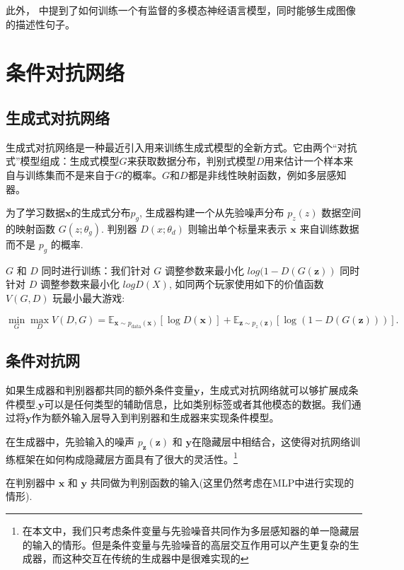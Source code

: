 \documentclass{article} %
\begin{document}
此外，\cite{kiros2013multimodal} 中提到了如何训练一个有监督的多模态神经语言模型，同时能够生成图像的描述性句子。

\section{条件对抗网络}
\subsection{生成式对抗网络}
生成式对抗网络是一种最近引入用来训练生成式模型的全新方式。它由两个“对抗式”模型组成：生成式模型$G$来获取数据分布，判别式模型$D$用来估计一个样本来自与训练集而不是来自于$G$的概率。$G$和$D$都是非线性映射函数，例如多层感知器。

为了学习数据${\bm{x}}$的生成式分布${p_g}$, 生成器构建一个从先验噪声分布 ${p_z(z)}$ 数据空间的映射函数 ${G(z;\theta_g)}$. 判别器 ${D(x; \theta_d)}$ 则输出单个标量来表示 ${\bm{x}}$ 来自训练数据而不是 ${p_g}$ 的概率.

${G}$ 和 ${D}$ 同时进行训练：我们针对 ${G}$ 调整参数来最小化 ${log(1-D(G(\bm{z}))}$ 同时针对 $D$ 调整参数来最小化 ${logD(X)}$, 如同两个玩家使用如下的价值函数 ${V(G, D)}$ 玩最小最大游戏:


\begin{equation}
\label{eq:minimaxgame-definition}
\min_G \max_D V(D, G) = \mathbb{E}_{\bm{x} \sim p_{\text{data}}(\bm{x})}[\log D(\bm{x})] + \mathbb{E}_{\bm{z} \sim p_z(\bm{z})}[\log (1 - D(G(\bm{z})))].
\end{equation}


\subsection{条件对抗网}

如果生成器和判别器都共同的额外条件变量${\bm{y}}$，生成式对抗网络就可以够扩展成条件模型.${\bm{y}}$可以是任何类型的辅助信息，比如类别标签或者其他模态的数据。我们通过将${\bm{y}}$作为额外输入层导入到判别器和生成器来实现条件模型。


在生成器中，先验输入的噪声 $p_{\bm{z}}(\bm{z})$ 和 ${\bm{y}}$在隐藏层中相结合，这使得对抗网络训练框架在如何构成隐藏层方面具有了很大的灵活性。\footnote{在本文中，我们只考虑条件变量与先验噪音共同作为多层感知器的单一隐藏层的输入的情形。但是条件变量与先验噪音的高层交互作用可以产生更复杂的生成器，而这种交互在传统的生成器中是很难实现的}

在判别器中 ${\bm{x}}$ 和 ${\bm{y}}$ 共同做为判别函数的输入(这里仍然考虑在MLP中进行实现的情形).
\end{document}

